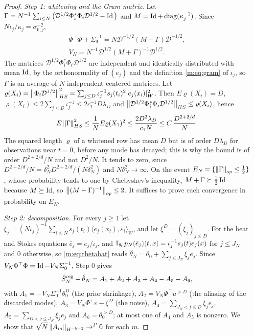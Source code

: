 \begin{proof}
\emph{Step 1: whitening and the Gram matrix.} Let $\Gamma=N^{-1}\sum_{i\le N}\big(\mathcal D^{1/2}\Phi_i^*\Phi_i\mathcal D^{1/2}-\operatorname{Id}\big)$ and $M=\operatorname{Id}+\operatorname{diag}(\kappa_j^{-1})$. Since $N\iota_j/\kappa_j=\sigma_{0,j}^{-2}$,
\[
\begin{gathered}
\Phi^\top\Phi+\Sigma_0^{-1}=N\mathcal D^{-1/2}(M+\Gamma)\mathcal D^{-1/2},\\
V_N=N^{-1}\mathcal D^{1/2}(M+\Gamma)^{-1}\mathcal D^{1/2}.
\end{gathered}
\]
The matrices $\mathcal D^{1/2}\Phi_i^*\Phi_i\mathcal D^{1/2}$ are independent and identically distributed with mean $\operatorname{Id}$, by the orthonormality of $(e_j)$ and the definition \eqref{m:eq:gram} of $\iota_j$, so $\Gamma$ is an average of $N$ independent centered matrices. Let $\varrho(X_i)=\left\|\Phi_i\mathcal D^{1/2}\right\|^2_{HS}=\sum_{j\le D}\iota_j^{-1}s_j(t_i)^2|e_j(x_i)|^2_W$. Then $E\varrho(X_i)=D$, $\varrho(X_i)\le2\sum_{j\le D}\iota_j^{-1}\le2c_1^{-1}D\lambda_D$ and $\left\|\mathcal D^{1/2}\Phi_i^*\Phi_i\mathcal D^{1/2}\right\|_{HS}\le\varrho(X_i)$, hence
\[
E\left\|\Gamma\right\|^2_{HS}\le\frac1NE\varrho(X_1)^2\le\frac{2D^2\lambda_D}{c_1N}\le C\,\frac{D^{2+2/d}}N .
\]
The squared length $\varrho$ of a whitened row has mean $D$ but is of order $D\lambda_D$ for observations near $t=0$, before any mode has decayed; this is why the bound is of order $D^{2+2/d}/N$ and not $D^2/N$. It tends to zero, since $D^{2+2/d}/N=\delta_N^2D^{2+2/d}/(N\delta_N^2)$ and $N\delta_N^2\to\infty$. On the event $E_N=\{\left\|\Gamma\right\|_{op}\le\tfrac12\}$, whose probability tends to one by Chebyshev's inequality, $M+\Gamma\succeq\tfrac12\operatorname{Id}$ because $M\succeq\operatorname{Id}$, so $\left\|(M+\Gamma)^{-1}\right\|_{op}\le2$. It suffices to prove each convergence in probability on $E_N$.

\emph{Step 2: decomposition.} For every $j\ge1$ let $\xi_j=(N\iota_j)^{-1}\sum_{i\le N}s_j(t_i)\langle e_j(x_i),\varepsilon_i\rangle_W$, and let $\xi^D=(\xi_j)_{j\le D}$. For the heat and Stokes equations $\bar e_j=e_j/\iota_j$, and $\mathbb{I}_{\theta_0}p_N(\bar e_j)(t,x)=\iota_j^{-1}s_j(t)e_j(x)$ for $j\le J_N$ and $0$ otherwise, so \eqref{m:eq:thetahat} reads $\hat\theta_N=\theta_0+\sum_{j\le J_N}\xi_je_j$. Since $V_N\Phi^\top\Phi=\operatorname{Id}-V_N\Sigma_0^{-1}$, Step 0 gives
\[
\hat S^{\rm reg}_N-\hat\theta_N=A_1+A_2+A_3+A_4-A_5-A_6,
\]
with $A_1=-V_N\Sigma_0^{-1}\theta_0^D$ (the prior shrinkage), $A_2=V_N\Phi^\top u^{>D}$ (the aliasing of the discarded modes), $A_3=V_N\Phi^\top\varepsilon-\xi^D$ (the noise), $A_4=\sum_{J_N<j\le D}\xi_je_j$, $A_5=\sum_{D<j\le J_N}\xi_je_j$ and $A_6=\theta_0^{>D}$; at most one of $A_4$ and $A_5$ is nonzero. We show that $\sqrt N\left\|A_m\right\|_{H^{-k-2}}\to^P0$ for each $m$.


\end{proof}
